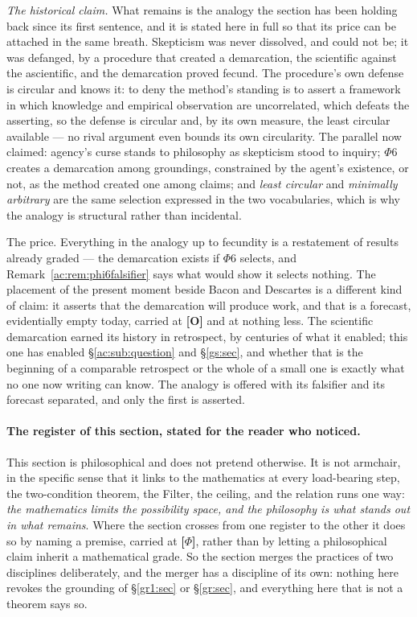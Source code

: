 \documentclass[11pt]{article}
\numberwithin{equation}{section}
\theoremstyle{plain}
\theoremstyle{definition}
\theoremstyle{remark}
\begin{document}
\emph{The historical claim.} What remains is the analogy the section has been holding back since its first sentence, and it is stated here in full so that its price can be attached in the same breath. Skepticism was never dissolved, and could not be; it was defanged, by a procedure that created a demarcation, the scientific against the ascientific, and the demarcation proved fecund. The procedure's own defense is circular and knows it: to deny the method's standing is to assert a framework in which knowledge and empirical observation are uncorrelated, which defeats the asserting, so the defense is circular and, by its own measure, the least circular available --- no rival argument even bounds its own circularity. The parallel now claimed: agency's curse stands to philosophy as skepticism stood to inquiry; $\Phi6$ creates a demarcation among groundings, constrained by the agent's existence, or not, as the method created one among claims; and \emph{least circular} and \emph{minimally arbitrary} are the same selection expressed in the two vocabularies, which is why the analogy is structural rather than incidental.

The price. Everything in the analogy up to fecundity is a restatement of results already graded --- the demarcation exists if $\Phi6$ selects, and Remark~\ref{ac:rem:phi6falsifier} says what would show it selects nothing. The placement of the present moment beside Bacon and Descartes is a different kind of claim: it asserts that the demarcation will produce work, and that is a forecast, evidentially empty today, carried at \textbf{[O]} and at nothing less. The scientific demarcation earned its history in retrospect, by centuries of what it enabled; this one has enabled \S\ref{ac:sub:question} and \S\ref{gs:sec}, and whether that is the beginning of a comparable retrospect or the whole of a small one is exactly what no one now writing can know. The analogy is offered with its falsifier and its forecast separated, and only the first is asserted.

\paragraph{The register of this section, stated for the reader who
noticed.}\label{ac:rem:register}
This section is philosophical and does not pretend otherwise. It is not
armchair, in the specific sense that it links to the mathematics at every
load-bearing step, the two-condition theorem, the Filter, the ceiling, and the relation runs one way: \emph{the mathematics limits the
possibility space, and the philosophy is what stands out in what remains}.
Where the section crosses from one register to the other it does so by
naming a premise, carried at \textbf{[$\Phi$]}, rather than by letting a
philosophical claim inherit a mathematical grade. So the section merges
the practices of two disciplines deliberately, and the merger has a
discipline of its own: nothing here revokes the grounding of
\S\ref{gr1:sec} or \S\ref{gr:sec}, and everything here that is not a
theorem says so.
\end{document}
